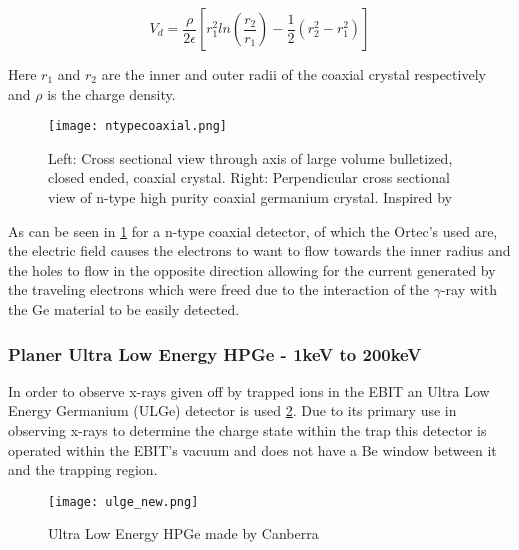 \documentclass[jon_ringuette_thesis_proposal.tex]{subfiles}
\begin{document}
    \begin{equation}
        V_d = \frac{\rho}{2\epsilon} \left[ r^2_1 ln\left(\frac{r_2}{r_1}\right) - \frac{1}{2}(r^2_2-r^2_1)\right]
        \label{eq:coaxial_depletion_depth}
    \end{equation}

    Here $r_1$ and $r_2$ are the inner and outer radii of the coaxial crystal respectively and $\rho$ is the charge density.

    \begin{figure}[H]
        \begin{center}
            \texttt{[image: ntypecoaxial.png]}
        \end{center}
        \caption{\small Left: Cross sectional view through axis of large volume bulletized, closed ended, coaxial crystal. Right: Perpendicular cross sectional view of n-type high purity coaxial germanium crystal. Inspired by \cite{KNOLL}}
        \label{fig:NTYPE_COAXIAL}
    \end{figure}

    As can be seen in \ref{fig:NTYPE_COAXIAL} for a n-type coaxial detector, of which the Ortec's used are, the electric field causes the electrons to want to flow towards the inner radius and the holes to flow in the opposite direction allowing for the current generated by the traveling electrons which were freed due to the interaction of the $\gamma$-ray with the Ge material to be easily detected.


    \subsubsection{Planer Ultra Low Energy HPGe - 1keV to 200keV}
    In order to observe x-rays given off by trapped ions in the EBIT an Ultra Low Energy Germanium (ULGe) detector is used \ref{fig:ULGE_NEW}.
    Due to its primary use in observing x-rays to determine the charge state within the trap this detector is operated within the EBIT's vacuum and does not have a Be window between it and the trapping region.

    \begin{figure}[H]
        \begin{center}
            \texttt{[image: ulge\_new.png]}
        \end{center}
        \caption{\small Ultra Low Energy HPGe made by Canberra}
        \label{fig:ULGE_NEW}
    \end{figure}
\end{document}
